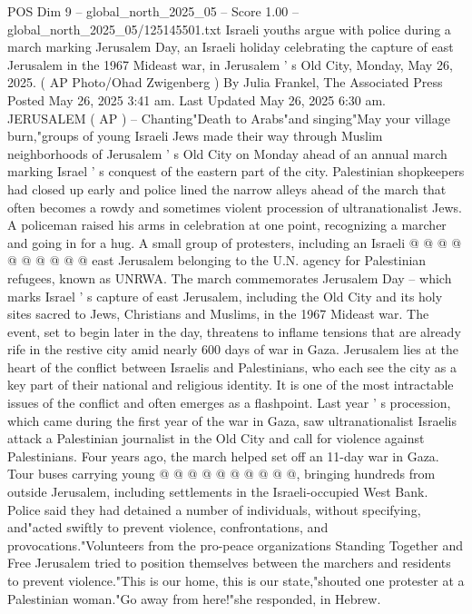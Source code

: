 \begin{textsample}{POS Dim 9 – global\_north\_2025\_05 – Score 1.00 – global\_north\_2025\_05/125145501.txt}  \label{ex:f9_pos_271}
Israeli youths argue with police during a march marking Jerusalem Day, an Israeli holiday celebrating the capture of east Jerusalem in the 1967 Mideast war, in Jerusalem ' s Old City, Monday, May 26, 2025. ( AP Photo/Ohad Zwigenberg ) By Julia Frankel, The Associated Press Posted May 26, 2025 3:41 am.
Last Updated May 26, 2025 6:30 am.
JERUSALEM ( AP ) -- Chanting"Death to Arabs"and singing"May your village burn,"groups of young Israeli Jews made their way through Muslim neighborhoods of Jerusalem ' s Old City on Monday ahead of an annual march marking Israel ' s conquest of the eastern part of the city.
Palestinian shopkeepers had closed up early and police lined the narrow alleys ahead of the march that often becomes a rowdy and sometimes violent procession of ultranationalist Jews.
A policeman raised his arms in celebration at one point, recognizing a marcher and going in for a hug.
A small group of protesters, including an Israeli @ @ @ @ @ @ @ @ @ @ east Jerusalem belonging to the U.N. agency for Palestinian refugees, known as UNRWA.
The march commemorates Jerusalem Day -- which marks Israel ' s capture of east Jerusalem, including the Old City and its holy sites sacred to Jews, Christians and Muslims, in the 1967 Mideast war.
The event, set to begin later in the day, threatens to inflame tensions that are already rife in the restive city amid nearly 600 days of war in Gaza.
Jerusalem lies at the heart of the conflict between Israelis and Palestinians, who each see the city as a key part of their national and religious identity.
It is one of the most intractable issues of the conflict and often emerges as a flashpoint.
Last year ' s procession, which came during the first year of the war in Gaza, saw ultranationalist Israelis attack a Palestinian journalist in the Old City and call for violence against Palestinians.
Four years ago, the march helped set off an 11-day war in Gaza.
Tour buses carrying young @ @ @ @ @ @ @ @ @ @, bringing hundreds from outside Jerusalem, including settlements in the Israeli-occupied West Bank.
Police said they had detained a number of individuals, without specifying, and"acted swiftly to prevent violence, confrontations, and provocations."Volunteers from the pro-peace organizations Standing Together and Free Jerusalem tried to position themselves between the marchers and residents to prevent violence."This is our home, this is our state,"shouted one protester at a Palestinian woman."Go away from here!"she responded, in Hebrew.

\end{textsample}

